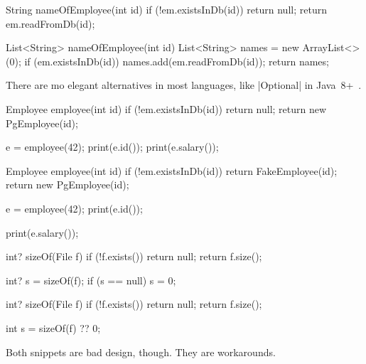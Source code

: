 \documentclass{article}
\begin{document}
\begin{pptWide}{2}
{\small\begin{ffcode}
String nameOfEmployee(int id) {
  if (!em.existsInDb(id)) {
    return null;
  }
  return em.readFromDb(id);
}
\end{ffcode}
}
\par\columnbreak\par
{\small\begin{ffcode}
List<String> nameOfEmployee(int id) {
  List<String> names =
    new ArrayList<>(0);
  if (em.existsInDb(id)) {
    names.add(em.readFromDb(id));
  }
  return names;
}
\end{ffcode}
}
\end{pptWide}
\par
There are mo elegant alternatives in most languages, like |Optional| in Java~8+~\citep{bugayenko2018blog0522}.
\plush{}


\begin{pptWide}{2}
{\small\begin{ffcode}
Employee employee(int id) {
  if (!em.existsInDb(id)) {
    return null;
  }
  return new PgEmployee(id);
}

e = employee(42);
print(e.id());
print(e.salary());
\end{ffcode}
}
\par\columnbreak\par
{\small\begin{ffcode}
Employee employee(int id) {
  if (!em.existsInDb(id)) {
    return FakeEmployee(id);
  }
  return new PgEmployee(id);
}

e = employee(42);
print(e.id());

print(e.salary());
\end{ffcode}
}
\end{pptWide}
\par
\plush{}


\begin{pptWide}{2}
{\small\begin{ffcode}
int? sizeOf(File f) {
  if (!f.exists()) {
    return null;
  }
  return f.size();
}

int? s = sizeOf(f);
if (s == null) {
  s = 0;
}
\end{ffcode}
}
\par\columnbreak\par
{\small\begin{ffcode}
int? sizeOf(File f) {
  if (!f.exists()) {
    return null;
  }
  return f.size();
}

int s = sizeOf(f) ?? 0;
\end{ffcode}
}
\end{pptWide}
\par
Both snippets are bad design, though. They are workarounds.
\plush{}
\end{document}
